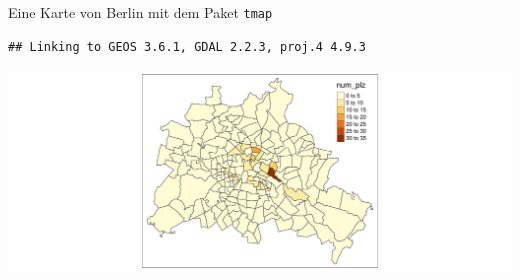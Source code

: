 \documentclass[ignorenonframetext,]{beamer}
\newenvironment{Shaded}{\begin{snugshade}}{\end{snugshade}}
\newcommand{\DataTypeTok}[1]{\textcolor[rgb]{0.74,0.68,0.62}{\underline{#1}}}
\newcommand{\DecValTok}[1]{\textcolor[rgb]{0.27,0.67,0.26}{#1}}
\newcommand{\KeywordTok}[1]{\textcolor[rgb]{0.26,0.66,0.93}{\textbf{#1}}}
\newcommand{\NormalTok}[1]{\textcolor[rgb]{0.74,0.68,0.62}{#1}}
\newcommand{\OperatorTok}[1]{\textcolor[rgb]{0.74,0.68,0.62}{#1}}
\newcommand{\StringTok}[1]{\textcolor[rgb]{0.02,0.61,0.04}{#1}}
\begin{document}
\begin{frame}[fragile]{Eine Karte von Berlin mit dem Paket
\texttt{tmap}}
\protect\hypertarget{eine-karte-von-berlin-mit-dem-paket-tmap}{}

\begin{Shaded}
\end{Shaded}

\begin{verbatim}
## Linking to GEOS 3.6.1, GDAL 2.2.3, proj.4 4.9.3
\end{verbatim}

\includegraphics{B4_Overpass_files/figure-beamer/unnamed-chunk-19-1.pdf}

\end{frame}
\end{document}
